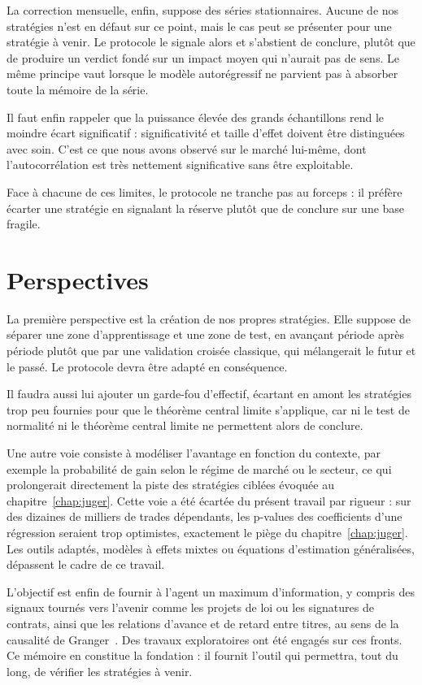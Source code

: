 La correction mensuelle, enfin, suppose des séries stationnaires. Aucune de
nos stratégies n'est en défaut sur ce point, mais le cas peut se présenter
pour une stratégie à venir. Le protocole le signale alors et s'abstient de
conclure, plutôt que de produire un verdict fondé sur un impact moyen qui
n'aurait pas de sens. Le même principe vaut lorsque le modèle autorégressif
ne parvient pas à absorber toute la mémoire de la série.

Il faut enfin rappeler que la puissance élevée des grands échantillons rend le
moindre écart significatif : significativité et taille d'effet doivent être
distinguées avec soin. C'est ce que nous avons observé sur le marché lui-même,
dont l'autocorrélation est très nettement significative sans être exploitable.

Face à chacune de ces limites, le protocole ne tranche pas au forceps : il
préfère écarter une stratégie en signalant la réserve plutôt que de conclure
sur une base fragile.

\section{Perspectives}
\label{sec:perspectives}

La première perspective est la création de nos propres stratégies. Elle
suppose de séparer une zone d'apprentissage et une zone de test, en avançant
période après période plutôt que par une validation croisée classique, qui
mélangerait le futur et le passé. Le protocole devra être adapté en
conséquence.

Il faudra aussi lui ajouter un garde-fou d'effectif, écartant en amont les
stratégies trop peu fournies pour que le théorème central limite s'applique,
car ni le test de normalité ni le théorème central limite ne permettent alors
de conclure.

Une autre voie consiste à modéliser l'avantage en fonction du contexte, par
exemple la probabilité de gain selon le régime de marché ou le secteur, ce qui
prolongerait directement la piste des stratégies ciblées évoquée au
chapitre~\ref{chap:juger}. Cette voie a été écartée du présent travail par
rigueur : sur des dizaines de milliers de trades dépendants, les p-values des
coefficients d'une régression seraient trop optimistes, exactement le piège du
chapitre~\ref{chap:juger}. Les outils adaptés, modèles à effets mixtes ou
équations d'estimation généralisées, dépassent le cadre de ce travail.

L'objectif est enfin de fournir à l'agent un maximum d'information, y compris
des signaux tournés vers l'avenir comme les projets de loi ou les signatures de
contrats, ainsi que les relations d'avance et de retard entre titres, au sens
de la causalité de Granger~\cite{granger1969}. Des travaux exploratoires ont
été engagés sur ces fronts. Ce mémoire en constitue la fondation : il fournit
l'outil qui permettra, tout du long, de vérifier les stratégies à venir.